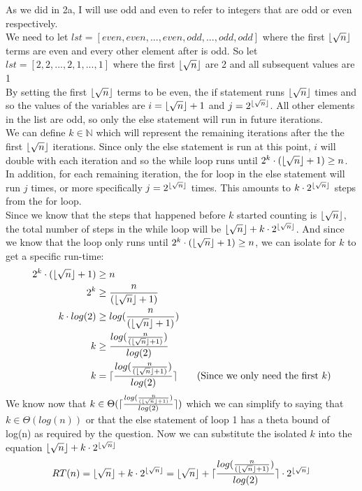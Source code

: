 \documentclass[20pt]{article}
\DeclarePairedDelimiter{\ceil}{\lceil}{\rceil}
\DeclarePairedDelimiter\floor{\lfloor}{\rfloor}
\begin{document}
\begin{enumerate}
    As we did in 2a, I will use odd and even to refer to integers that are odd or even respectively.\\
     We need to let $lst = [even, even, ... , even, odd, ... , odd, odd]$ where the first $\floor{\sqrt{n}}$ terms are even and every other element after is odd. So let $lst = [2, 2, ..., 2, 1, ... , 1]$ where the first $\floor{\sqrt{n}}$ are 2 and all subsequent values are 1\\
    
    By setting the first $\floor{\sqrt{n}}$ terms to be even, the if statement runs $\floor{\sqrt{n}}$ times and so the values of the variables are $i = \floor{\sqrt{n}} + 1$ and $j = 2^{\floor{\sqrt{n}}}$. All other elements in the list are odd, so only the else statement will run in future iterations.\\
    
    We can define $k \in \mathbb{N}$ which will represent the remaining iterations after the the first $\floor{\sqrt{n}}$ iterations. Since only the else statement is run at this point, $i$ will double with each iteration and so the while loop runs until $2^k\cdot(\floor{\sqrt{n}} + 1) \geq n$.\\
    
    In addition, for each remaining iteration, the for loop in the else statement will run $j$ times, or more specifically $j = 2^{\floor{\sqrt{n}}}$ times. This amounts to $k\cdot 2^{\floor{\sqrt{n}}}$ steps from the for loop.\\
    
    Since we know that the steps that happened before $k$ started counting is $\floor{\sqrt{n}}$, the total number of steps in the while loop will be $\floor{\sqrt{n}} +k\cdot2^{\floor{\sqrt{n}}}$. And since we know that the loop only runs until $2^k\cdot(\floor{\sqrt{n}} + 1) \geq n$, we can isolate for $k$ to get a specific run-time:
    \begin{align}
        2^k\cdot(\floor{\sqrt{n}} + 1) &\geq n\nonumber\\
        2^k &\geq \frac{n}{(\floor{\sqrt{n}} + 1)}\nonumber\\
        k\cdot log(2) &\geq log(\frac{n}{(\floor{\sqrt{n}} + 1)})\nonumber\\
        k &\geq \frac{log(\frac{n}{(\floor{\sqrt{n}} + 1)})}{log(2)}\nonumber\\
        k &= \ceil{\frac{log(\frac{n}{(\floor{\sqrt{n}} + 1)})}{log(2)}}\tag{Since we only need the first $k$}
    \end{align}
    We know now that $k\in\Theta(\ceil{\frac{log(\frac{n}{(\floor{\sqrt{n}} + 1)})}{log(2)}})$ which we can simplify to saying that $k\in\Theta(log(n))$ or that the else statement of loop 1 has a theta bound of log(n) as required by the question. Now we can substitute the isolated $k$ into the equation $\floor{\sqrt{n}} +k\cdot2^{\floor{\sqrt{n}}}$\\
    \begin{align}
        RT(n) = \floor{\sqrt{n}} +k\cdot2^{\floor{\sqrt{n}}} = \floor{\sqrt{n}} +\ceil{\frac{log(\frac{n}{(\floor{\sqrt{n}} + 1)})}{log(2)}}\cdot2^{\floor{\sqrt{n}}} \nonumber
    \end{align}
    

\end{enumerate}
\end{document}
